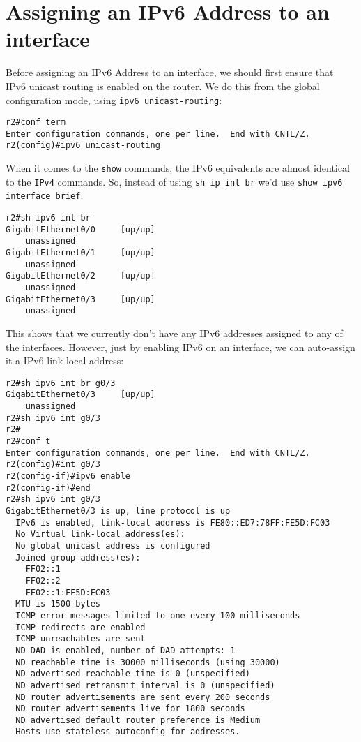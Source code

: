 \section{Assigning an IPv6 Address to an interface}
Before assigning an IPv6 Address to an interface, we should first ensure that IPv6 unicast routing is enabled on the router. We do this from the global configuration mode, using \verb|ipv6 unicast-routing|:

\vspace{-15pt}
\begin{verbatim}
r2#conf term
Enter configuration commands, one per line.  End with CNTL/Z.
r2(config)#ipv6 unicast-routing
\end{verbatim}
\vspace{-10pt}

\noindent
When it comes to the \verb|show| commands, the IPv6 equivalents are almost identical to the \verb|IPv4| commands. So, instead of using \verb|sh ip int br| we'd use \verb|show ipv6 interface brief|:

\vspace{-15pt}
\begin{verbatim}
r2#sh ipv6 int br
GigabitEthernet0/0     [up/up]
    unassigned
GigabitEthernet0/1     [up/up]
    unassigned
GigabitEthernet0/2     [up/up]
    unassigned
GigabitEthernet0/3     [up/up]
    unassigned
\end{verbatim}
\vspace{-10pt}

\noindent
This shows that we currently don't have any IPv6 addresses assigned to any of the interfaces. 
However, just by enabling IPv6 on an interface, we can auto-assign it a IPv6 link local address:

\vspace{-15pt}
\begin{verbatim}
r2#sh ipv6 int br g0/3
GigabitEthernet0/3     [up/up]
    unassigned
r2#sh ipv6 int g0/3
r2#
r2#conf t
Enter configuration commands, one per line.  End with CNTL/Z.
r2(config)#int g0/3
r2(config-if)#ipv6 enable
r2(config-if)#end
r2#sh ipv6 int g0/3
GigabitEthernet0/3 is up, line protocol is up
  IPv6 is enabled, link-local address is FE80::ED7:78FF:FE5D:FC03
  No Virtual link-local address(es):
  No global unicast address is configured
  Joined group address(es):
    FF02::1
    FF02::2
    FF02::1:FF5D:FC03
  MTU is 1500 bytes
  ICMP error messages limited to one every 100 milliseconds
  ICMP redirects are enabled
  ICMP unreachables are sent
  ND DAD is enabled, number of DAD attempts: 1
  ND reachable time is 30000 milliseconds (using 30000)
  ND advertised reachable time is 0 (unspecified)
  ND advertised retransmit interval is 0 (unspecified)
  ND router advertisements are sent every 200 seconds
  ND router advertisements live for 1800 seconds
  ND advertised default router preference is Medium
  Hosts use stateless autoconfig for addresses.
\end{verbatim}
\vspace{-10pt}

